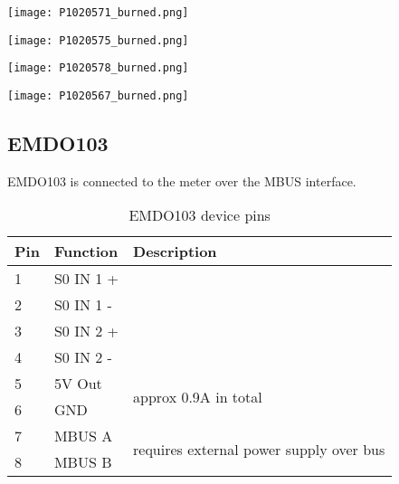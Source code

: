 \documentclass[11pt,fleqn]{book} %
\numberwithin{equation}{section} %
\numberwithin{figure}{section} %
\numberwithin{table}{section} %
\begin{document}



\begin{comment}
two rs485
two relay output drivers
two s0 electrical inputs
two s0 electrical outputs
board temperature sensor
1 wire
Ethernet 
usb for firmware update
default reset button
Requires 24V DIN rail power supply
picture emdo102

\end{comment}
\begin{center}
\texttt{[image: P1020571\_burned.png]}
\end{center}
\begin{center}
\texttt{[image: P1020575\_burned.png]}
\end{center}
\begin{center}
\texttt{[image: P1020578\_burned.png]}
\end{center}
\begin{center}
\texttt{[image: P1020567\_burned.png]}
\end{center}


\newpage
\subsection{EMDO103}
EMDO103 is connected to the meter over the MBUS interface.

\begin{table}
\caption{EMDO103 device pins}
\label{}
\begin{tabular}{@{}l l l @{}}\\\hline
Pin & Function & Description \\\hline
1 & S0 IN 1 + & \\
2 & S0 IN 1 - & \\
3 & S0 IN 2 + & \\
4 & S0 IN 2 - & \\
5 & 5V Out & \multirow{2}{10cm}{approx 0.9A in total} \\
6 & GND & \\
7 & MBUS A & \multirow{2}{10cm}{requires external power supply over bus} \\
8 & MBUS B &  \\\hline
\end{tabular}
\end{table}
\end{document}
